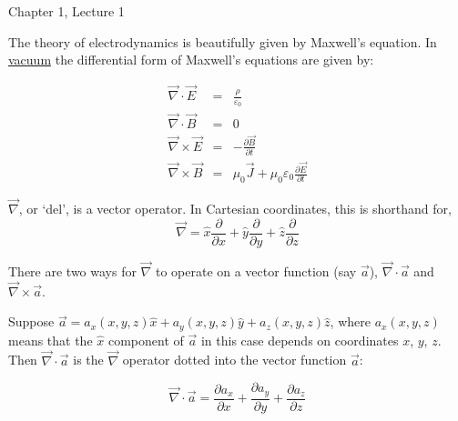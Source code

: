 \documentclass[12pt]{article}
\begin{document}
\begin{flushright} {\color{blue} Chapter 1, Lecture 1} \end{flushright}
\begin{flushleft}


The theory of electrodynamics is beautifully given by Maxwell's equation.  In \underline{vacuum} the differential form of Maxwell's equations are given by:

\begin{eqnarray}
 \vec{\nabla} \cdot \vec{E} & = & \frac{\rho}{\varepsilon_{0}} \label{eq:divE}\\
 \vec{\nabla} \cdot \vec{B} & = & 0 \\
 \vec{\nabla} \times \vec{E} & = & -\frac{\partial \vec{B}}{\partial t} \label{eq:curlE} \\
\vec{\nabla} \times \vec{B} & = & \mu_{0}\vec{J}+\mu_{0}\varepsilon_{0}\frac{\partial \vec{E}}{\partial t} \label{eq:curlB} 
\end{eqnarray}

\vspace{.2in}
$\vec{\nabla}$, or `del', is a vector operator.  In Cartesian coordinates, this is shorthand for,  
\[
\vec{\nabla}=\hat{x}\frac{\partial}{\partial x} +\hat{y}\frac{\partial}{\partial y}+\hat{z}\frac{\partial}{\partial z}
\] 

There are two ways for $\vec{\nabla}$ to operate on a vector function (say $\vec{a}$), $\vec{\nabla} \cdot \vec{a}$ and $\vec{\nabla} \times \vec{a}$.

\vspace{.2in}
Suppose $\vec{a}=a_{x}(x,y,z)\hat{x}+a_{y}(x,y,z)\hat{y}+a_{z}(x,y,z)\hat{z}$, where $a_{x}(x,y,z)$ means that the $\hat{x}$ component of $\vec{a}$ in this case depends on coordinates $x$, $y$, $z$.  Then $\vec{\nabla} \cdot \vec{a}$ is the $\vec{\nabla}$ operator dotted into the vector function $\vec{a}$:

\begin{equation*}
\vec{\nabla} \cdot \vec{a}=\frac{\partial a_{x}}{\partial x} +\frac{\partial a_{y}}{\partial y}+\frac{\partial a_{z}}{\partial z}
\end{equation*}


\end{flushleft}
\end{document}
